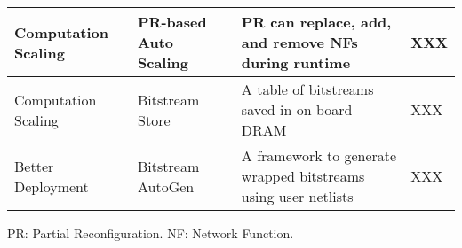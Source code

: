 {\begin{table*}[th]
\begin{center}
\begin{tabular}{ p{1in} | p{1.5in} |p{3.3in} | p{0.5in}}
Computation Scaling & PR-based Auto Scaling & PR can replace, add, and remove NFs during runtime & XXX \\
\hline

Computation Scaling & Bitstream Store & A table of bitstreams saved in on-board DRAM & XXX \\
\hline

Better Deployment & Bitstream AutoGen & A framework to generate wrapped bitstreams using user netlists & XXX \\
\hline


\end{tabular}
\end{center}
{
PR: Partial Reconfiguration.
NF: Network Function.
}
\end{table*}
}
